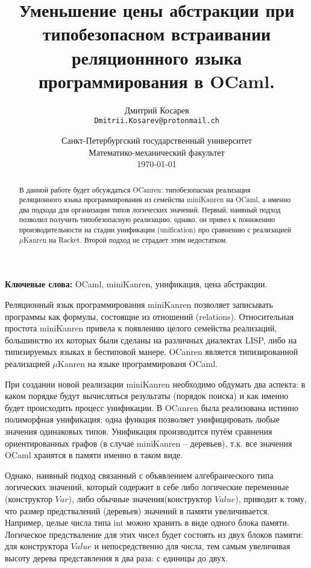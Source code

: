 \documentclass[10pt]{article}
\title{Уменьшение цены абстракции при типобезопасном встраивании реляционнного языка программирования в OCaml.}
\author{
        Дмитрий Косарев\\ \texttt{Dmitrii.Kosarev@protonmail.ch}
}
\date{
  Санкт-Петербургский государственный университет\\
  Математико-механический факультет\\
  \today
}
\begin{document}
\maketitle

\begin{abstract}
В данной работе будет обсуждаться OCanren: типобезопасная реализация реляционного языка программирования
из семейства miniKanren на OCaml, а именно два подхода для организации типов логических значений. Первый,
наивный подход позволил получить типобезопасную реализацию, однако, он привел к понижению производительности
на стадии унификации (unification) про сравнению с реализацией $\mu$Kanren на Racket. Второй подход не 
страдает этим недостатком.

\end{abstract}

\textbf{Ключевые слова:} OCaml, miniKanren, унификация, цена абстракции.

\vspace{5mm}

Реляционный язык программирования miniKanren позволяет записывать программы как формулы, состоящие из отношений
(relations). Относительная простота miniKanren привела к появлению целого семейства реализаций, большинство их 
которых были сделаны на различных диалектах LISP, либо на типизируемых языках в бестиповой манере. OCanren 
является типизированной реализацией $\mu$Kanren на языке программированя OCaml.


При создании новой реализации miniKanren необходимо обдумать два аспекта: в каком порядке будут вычисляться 
результаты (порядок поиска) и как именно будет происходить процесс унификации. В OCanren была реализована истинно 
полиморфная унификация: одна функция позволяет унифицировать любые значения одинаковых типов. Унификация производится
путём сравнения ориентированных графов (в случае miniKanren -- деревьев), т.к. все значения OCaml хранятся в 
памяти именно в таком виде.

Однако, наивный подход связанный с объявлением алгебраического типа логических значений, который содержит в себе 
либо логические переменные (конструктор $Var$), либо обычные значения(конструктор $Value$), приводит к тому, что 
размер предствалений (деревьев) значений в памяти увеличивается. 
Например, целые числа типа int можно хранить в виде одного блока памяти. Логическое предстваление для этих чисел
будет состоять из двух блоков памяти: для конструктора $Value$ и непосредственно для числа, тем самым увеличивая 
высоту дерева представления в два раза: с единицы до двух.
\end{document}
